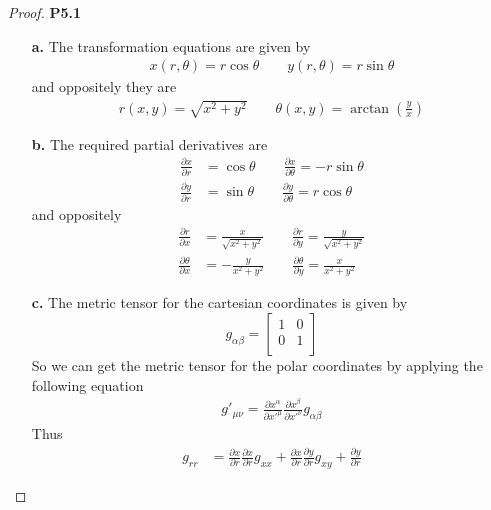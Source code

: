 \documentclass[11pt]{article}
\theoremstyle{definition}
\begin{document}
\begin{proof}{\textbf{P5.1}}
\begin{itemize}
    \item [\bf{a.}] The transformation equations are given by
    \begin{align*}
        x(r, \theta) = r\cos\theta \quad\quad y(r, \theta) = r\sin\theta
    \end{align*}
    and oppositely they are
    \begin{align*}
        r(x, y) = \sqrt{x^2 + y^2} \quad\quad
        \theta(x, y) = \arctan\left(\frac{y}{x}\right)
    \end{align*}
    \item [\bf{b.}] The required partial derivatives are
    \begin{align*}
        \frac{\partial x}{\partial r} &= \cos\theta \quad\quad
        \frac{\partial x}{\partial \theta} = -r\sin\theta\\
        \frac{\partial y}{\partial r} &= \sin\theta \quad\quad
        \frac{\partial y}{\partial \theta} = r\cos\theta
    \end{align*}
    and oppositely 
    \begin{align*}
        \frac{\partial r}{\partial x} &= \frac{x}{\sqrt{x^2 + y^2}} \quad\quad
        \frac{\partial r}{\partial y} = \frac{y}{\sqrt{x^2 + y^2}}\\
        \frac{\partial \theta}{\partial x} &= -\frac{y}{x^2 + y^2}\quad\quad
        \frac{\partial \theta}{\partial y} = \frac{x}{x^2 + y^2}
    \end{align*}
\cleardoublepage
    \item [\bf{c.}] The metric tensor for the cartesian coordinates is given by
    $$g_{\alpha\beta} = \begin{bmatrix}
        1 & 0\\
        0 & 1\\
    \end{bmatrix}$$
    So we can get the metric tensor for the polar coordinates by applying the
    following equation
    \begin{align*}
        g'_{\mu\nu} = \frac{\partial x^\alpha}{\partial x'^\mu}
        \frac{\partial x^\beta}{\partial x'^\nu} g_{\alpha\beta}
    \end{align*}
    Thus
    \begin{align*}
        g_{rr} &= \frac{\partial x}{\partial r}
        \frac{\partial x}{\partial r} g_{xx} + \frac{\partial x}{\partial r}
        \frac{\partial y}{\partial r} g_{xy} + \frac{\partial y}{\partial r}

\end{align*}
\end{itemize}
\end{proof}
\end{document}
